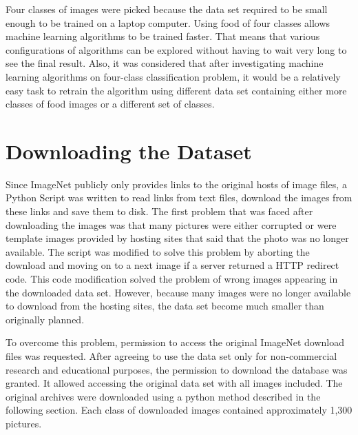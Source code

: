 Four classes of images were picked because the data set required to be small enough to be trained on a laptop computer.  Using food of four classes allows machine learning algorithms to be trained faster. That means that various configurations of algorithms can be explored without having to wait very long to see the final result. Also, it was considered that after investigating machine learning algorithms on four-class classification problem, it would be a relatively easy task to retrain the algorithm using different data set containing either more classes of food images or a different set of classes.

\section {Downloading the Dataset}
Since ImageNet publicly only provides links to the original hosts of image files,  a Python Script was written to read links from text files, download the images from these links and save them to disk.  The first problem that was faced after downloading the images was that many pictures were either corrupted or were template images provided by hosting sites that said that the photo was no longer available. The script was modified to solve this problem by aborting the download and moving on to a next image if a server returned a HTTP redirect code. This code modification solved the problem of wrong images appearing in the downloaded data set. However, because many images were no longer available to download from the hosting sites, the data set become much smaller than originally planned.  

To overcome this problem, permission to access the original ImageNet download files was requested. After agreeing to use the data set only for non-commercial research and educational purposes, the permission to download the database was granted. It allowed accessing the original data set with all images included. The original archives were downloaded using a python method described in the following section.  Each class of downloaded images contained approximately 1,300 pictures.

